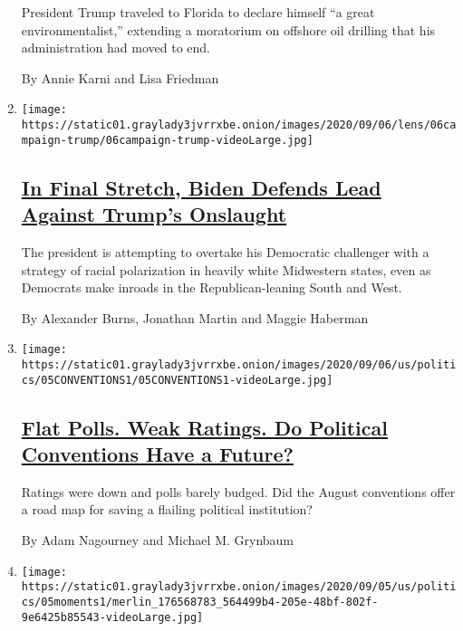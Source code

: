 \begin{enumerate}
  President Trump traveled to Florida to declare himself ``a great
  environmentalist,'' extending a moratorium on offshore oil drilling
  that his administration had moved to end.

  By Annie Karni and Lisa Friedman
\item
  \texttt{[image: https://static01.graylady3jvrrxbe.onion/images/2020/09/06/lens/06campaign-trump/06campaign-trump-videoLarge.jpg]}

  \hypertarget{in-final-stretch-biden-defends-lead-against-trumps-onslaught}{%
  \subsection{\texorpdfstring{\href{/2020/09/06/us/politics/trump-biden-2020.html}{In
  Final Stretch, Biden Defends Lead Against Trump's
  Onslaught}}{In Final Stretch, Biden Defends Lead Against Trump's Onslaught}}\label{in-final-stretch-biden-defends-lead-against-trumps-onslaught}}

  The president is attempting to overtake his Democratic challenger with
  a strategy of racial polarization in heavily white Midwestern states,
  even as Democrats make inroads in the Republican-leaning South and
  West.

  By Alexander Burns, Jonathan Martin and Maggie Haberman
\item
  \texttt{[image: https://static01.graylady3jvrrxbe.onion/images/2020/09/06/us/politics/05CONVENTIONS1/05CONVENTIONS1-videoLarge.jpg]}

  \hypertarget{flat-polls-weak-ratings-do-political-conventions-have-a-future}{%
  \subsection{\texorpdfstring{\href{/2020/09/05/us/elections/political-conventions-ending.html}{Flat
  Polls. Weak Ratings. Do Political Conventions Have a
  Future?}}{Flat Polls. Weak Ratings. Do Political Conventions Have a Future?}}\label{flat-polls-weak-ratings-do-political-conventions-have-a-future}}

  Ratings were down and polls barely budged. Did the August conventions
  offer a road map for saving a flailing political institution?

  By Adam Nagourney and Michael M. Grynbaum
\item
  \texttt{[image: https://static01.graylady3jvrrxbe.onion/images/2020/09/05/us/politics/05moments1/merlin\_176568783\_564499b4-205e-48bf-802f-9e6425b85543-videoLarge.jpg]}


\end{enumerate}
